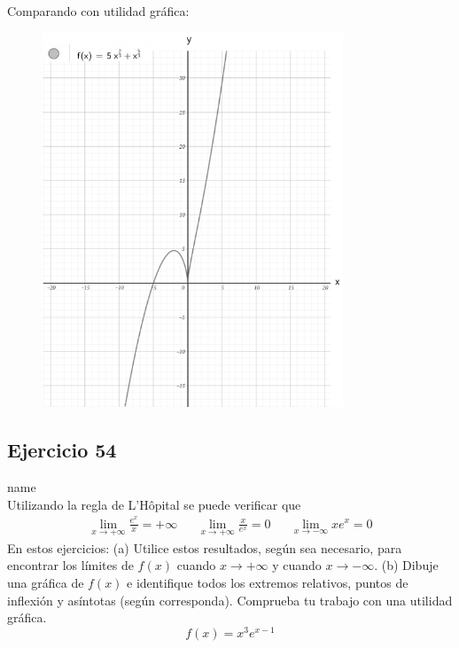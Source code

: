 \documentclass[12pt]{article}
\begin{document}
Comparando con utilidad gráfica:
\begin{figure}[H]
\centering
\includegraphics[width=0.8\textwidth]{../img/img_Lista3/p3_36.png}
\end{figure}



\subsection{Ejercicio 54} name \\

Utilizando la regla de L'Hôpital se puede verificar que
\begin{align*}
  \lim_{x \to +\infty} \frac{e^x}{x}=+\infty && \lim_{x \to +\infty} \frac{x}{e^x}=0 && \lim_{x \to -\infty} xe^x=0
\end{align*}
En estos ejercicios: (a) Utilice estos resultados, según sea necesario, para encontrar los límites de $f(x)$ cuando $x\rightarrow +\infty$ y cuando $x\rightarrow -\infty$. (b) Dibuje una gráfica de $f(x)$ e identifique todos los extremos relativos, puntos de inflexión y asíntotas (según corresponda). Comprueba tu trabajo con una utilidad gráfica.
\[
f(x)=x^3e^{x-1}
\]

\end{document}
